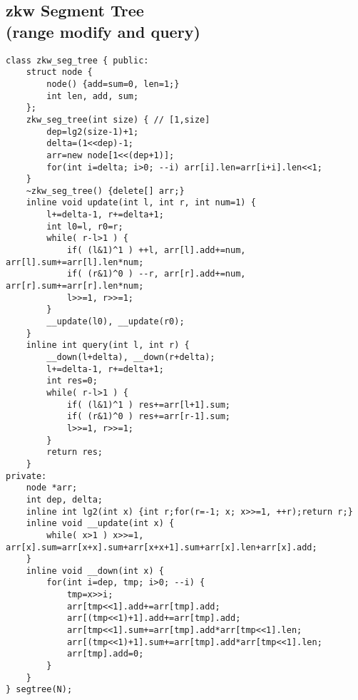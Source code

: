 \documentclass[11pt,twocolumn,a4paper]{article}
\begin{document}
\subsection{zkw Segment Tree\\(range modify and query)}
\begin{lstlisting}[label=zkw Segment Tree]
class zkw_seg_tree { public:
	struct node {
		node() {add=sum=0, len=1;}
		int len, add, sum; 
	};
	zkw_seg_tree(int size) { // [1,size]
		dep=lg2(size-1)+1;
		delta=(1<<dep)-1;
		arr=new node[1<<(dep+1)];
		for(int i=delta; i>0; --i) arr[i].len=arr[i+i].len<<1;
	}
	~zkw_seg_tree() {delete[] arr;}
	inline void update(int l, int r, int num=1) {
		l+=delta-1, r+=delta+1;
		int l0=l, r0=r;
		while( r-l>1 ) {
			if( (l&1)^1 ) ++l, arr[l].add+=num, arr[l].sum+=arr[l].len*num;
			if( (r&1)^0 ) --r, arr[r].add+=num, arr[r].sum+=arr[r].len*num;
			l>>=1, r>>=1;
		}
		__update(l0), __update(r0);
	}
	inline int query(int l, int r) {
		__down(l+delta), __down(r+delta);
		l+=delta-1, r+=delta+1;
		int res=0;
		while( r-l>1 ) {
			if( (l&1)^1 ) res+=arr[l+1].sum;
			if( (r&1)^0 ) res+=arr[r-1].sum;
			l>>=1, r>>=1;
		}
		return res;
	}
private:
	node *arr;
	int dep, delta;
	inline int lg2(int x) {int r;for(r=-1; x; x>>=1, ++r);return r;}
	inline void __update(int x) {
		while( x>1 ) x>>=1, arr[x].sum=arr[x+x].sum+arr[x+x+1].sum+arr[x].len+arr[x].add;
	}
	inline void __down(int x) {
		for(int i=dep, tmp; i>0; --i) {
			tmp=x>>i;
			arr[tmp<<1].add+=arr[tmp].add;
			arr[(tmp<<1)+1].add+=arr[tmp].add;
			arr[tmp<<1].sum+=arr[tmp].add*arr[tmp<<1].len;
			arr[(tmp<<1)+1].sum+=arr[tmp].add*arr[tmp<<1].len;
			arr[tmp].add=0;
		}
	}
} segtree(N);
\end{lstlisting}

\newpage
\end{document}
